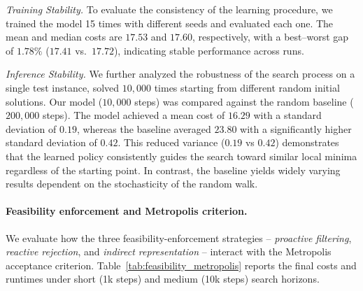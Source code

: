 \documentclass[letterpaper]{article} %
\begin{document}
\textit{Training Stability.} To evaluate the consistency of the learning procedure, we trained the model 15 times with different seeds and evaluated each one. The mean and median costs are $17.53$ and $17.60$, respectively, with a best–worst gap of $1.78\%$ ($17.41$ vs.\ $17.72$), indicating stable performance across runs.

\textit{Inference Stability.} We further analyzed the robustness of the search process on a single test instance, solved $10{,}000$ times starting from different random initial solutions. Our model ($10{,}000$ steps) was compared against the random baseline ($200{,}000$ steps). The model achieved a mean cost of $16.29$ with a standard deviation of $0.19$, whereas the baseline averaged $23.80$ with a significantly higher standard deviation of $0.42$.
This reduced variance ($0.19$ vs $0.42$) demonstrates that the learned policy consistently guides the search toward similar local minima regardless of the starting point. In contrast, the baseline yields widely varying results dependent on the stochasticity of the random walk.


\paragraph{Feasibility enforcement and Metropolis criterion.} 

We evaluate how the three feasibility-enforcement strategies -- \textit{proactive filtering}, \textit{reactive rejection}, and \textit{indirect representation} -- interact with the Metropolis acceptance criterion. Table~\ref{tab:feasibility_metropolis} reports the final costs and runtimes under short (1k steps) and medium (10k steps) search horizons.
\end{document}
